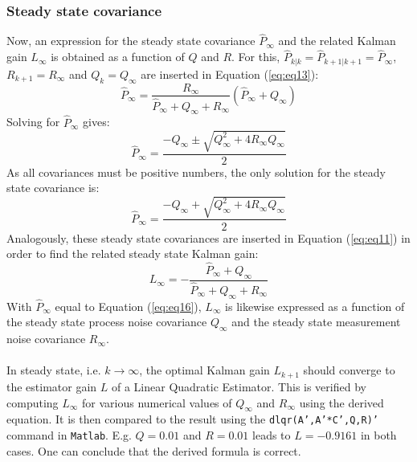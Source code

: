 \documentclass[a4paper,kul]{kulakarticle} %
\begin{document}
\subsubsection*{Steady state covariance}
Now, an expression for the steady state covariance $\hat{P}_\infty$ and the related Kalman gain $L_\infty$ is obtained as a function of $Q$ and $R$. For this, $\hat{P}_{k|k} = \hat{P}_{k+1|k+1} = \hat{P}_\infty$, $R_{k+1} = R_{\infty}$ and $Q_k = Q_\infty$ are inserted in Equation (\ref{eq:eq13}):
\begin{equation}
	\hat{P}_\infty = \frac{R_{\infty}}{\hat{P}_{\infty} + Q_\infty + R_{\infty}}\left(\hat{P}_{\infty} + Q_\infty\right)
\end{equation}
Solving for $\hat{P}_\infty$ gives:
\begin{equation}
	\hat{P}_\infty = \frac{-Q_\infty \pm \sqrt{Q_\infty^2 + 4R_\infty Q_\infty}}{2}
\end{equation}
As all covariances must be positive numbers, the only solution for the steady state covariance is: 
\begin{equation}
\hat{P}_\infty = \frac{-Q_\infty + \sqrt{Q_\infty^2 + 4R_\infty Q_\infty}}{2}
\label{eq:eq16}
\end{equation}
Analogously, these steady state covariances are inserted in Equation (\ref{eq:eq11}) in order to find the related steady state Kalman gain:
\begin{equation}
L_\infty = - \frac{\hat{P}_\infty + Q_\infty}{\hat{P}_\infty + Q_\infty + R_\infty}
\label{eq:eq17}
\end{equation}
With $\hat{P}_\infty$ equal to Equation (\ref{eq:eq16}), $L_\infty$ is likewise expressed as a function of the steady state process noise covariance $Q_\infty$ and the steady state measurement noise covariance $R_\infty$.
\\\\
In steady state, i.e. $k \rightarrow \infty$, the optimal Kalman gain $L_{k+1}$ should converge to the estimator gain $L$ of a Linear Quadratic Estimator. This is verified by computing $L_\infty$ for various numerical values of $Q_\infty$ and $R_\infty$ using the derived equation. It is then compared to the result using the \texttt{dlqr(A',A'*C',Q,R)'} command in \texttt{Matlab}. E.g. $Q = 0.01$ and $R = 0.01$ leads to $L = -0.9161$ in both cases. One can conclude that the derived formula is correct.
\end{document}
